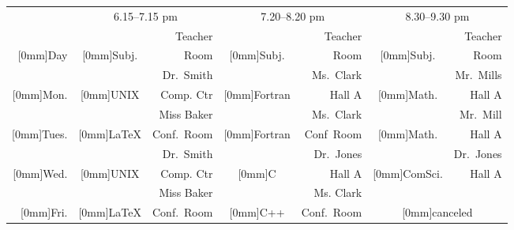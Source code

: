 \documentclass{article}
\newcommand{\rb}[1]{\raisebox{1.5ex}[0mm]{#1}}
\begin{document}
\setRTL
\begin{center}\small
\begin{tabular}{|r||c|r|c|r|c|r|}
\hline
& \multicolumn{2}{c|}{6.15--7.15 pm} & \multicolumn{2}{c|}{7.20--8.20 pm}
& \multicolumn{2}{c|}{8.30--9.30 pm} \\ \cline{2-7}
&& Teacher && Teacher && Teacher \\ \cline{3-3}\cline{5-5}\cline{7-7}
\rb{Day} & \rb{Subj.} & Room & \rb{Subj.} & Room & \rb{Subj.} & Room\\
   \hline\hline
&& Dr.~Smith && Ms.~Clark && Mr.~Mills\\
\cline{3-3}\cline{5-5}\cline{7-7}
\rb{Mon.} & \rb{UNIX} & Comp. Ctr & \rb{Fortran} & Hall A
  & \rb{Math.} & Hall A \\ \hline
&& Miss Baker && Ms.~Clark && Mr.~Mill\\
\cline{3-3}\cline{5-5}\cline{7-7}
\rb{Tues.} & \rb{\LaTeX} & Conf.~Room & \rb{Fortran} & Conf~Room
  & \rb{Math.} & Hall A \\ \hline
&& Dr.~Smith && Dr.~Jones && Dr.~Jones \\
\cline{3-3}\cline{5-5}\cline{7-7}
\rb{Wed.} & \rb{UNIX} & Comp. Ctr & \rb{C} & Hall A
  & \rb{ComSci.} & Hall A \\ \hline
&& Miss Baker && Ms. Clark & \multicolumn{2}{c|}{} \\
\cline{3-3}\cline{5-5}
\rb{Fri.} & \rb{\LaTeX} & Conf.~Room & \rb{C++} & Conf.~Room
& \multicolumn{2}{c|}{\rb{canceled}}\\ \hline
\end{tabular}\end{center}
\end{document}
